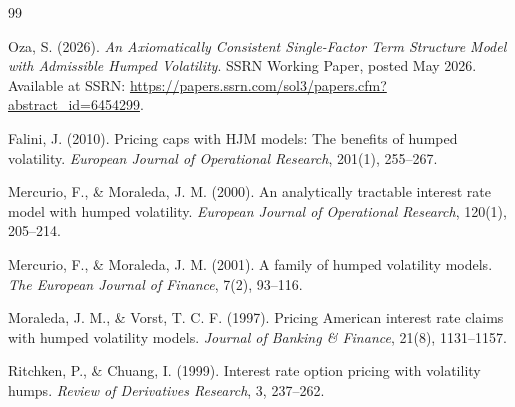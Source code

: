 \documentclass[11pt]{article}
\numberwithin{equation}{section}
\begin{document}
\begin{thebibliography}{99}

Oza, S. (2026).
\emph{An Axiomatically Consistent Single-Factor Term Structure Model with Admissible Humped Volatility}.
SSRN Working Paper, posted May 2026.
Available at SSRN: \url{https://papers.ssrn.com/sol3/papers.cfm?abstract_id=6454299}.

Falini, J. (2010).
Pricing caps with HJM models: The benefits of humped volatility.
\emph{European Journal of Operational Research}, 201(1), 255--267.

Mercurio, F., \& Moraleda, J. M. (2000).
An analytically tractable interest rate model with humped volatility.
\emph{European Journal of Operational Research}, 120(1), 205--214.

Mercurio, F., \& Moraleda, J. M. (2001).
A family of humped volatility models.
\emph{The European Journal of Finance}, 7(2), 93--116.

Moraleda, J. M., \& Vorst, T. C. F. (1997).
Pricing American interest rate claims with humped volatility models.
\emph{Journal of Banking \& Finance}, 21(8), 1131--1157.

Ritchken, P., \& Chuang, I. (1999).
Interest rate option pricing with volatility humps.
\emph{Review of Derivatives Research}, 3, 237--262.

\end{thebibliography}
\end{document}
